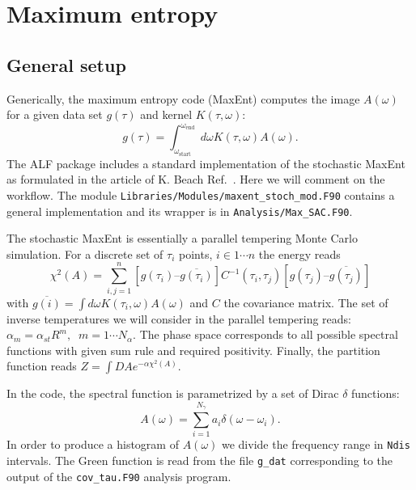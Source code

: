 

\section{Maximum entropy } \label{sec:maxent}

\subsection{General setup}
Generically, the maximum entropy code (MaxEnt) computes the  image  $A(\omega) $ for a given  data  set $g(\tau) $  and kernel $K(\tau,\omega) $:
\begin{equation}
g(\tau) =  \int_{\omega_\text{start}}^{\omega_\text{end}} d {\omega} K(\tau,\omega) A(\omega).
\end{equation} 
The  ALF package includes a standard implementation of the stochastic MaxEnt as formulated in the article of K. Beach Ref.~\cite{Beach04a}. Here we will comment on the workflow.  The module 
\texttt{Libraries/Modules/\allowbreak{}maxent\_stoch\_mod.F90} contains a general implementation and its wrapper is in \texttt{Analysis/Max\_SAC.F90}. 

The stochastic MaxEnt is essentially a parallel tempering Monte Carlo simulation.  For a discrete set of $\tau_i$ points,  $i \in 1 \cdots n $ the energy reads
\begin{equation}
  \chi^{2}(A) =  \sum_{i,j=1}^{n}   \left[ g(\tau_i)  –    \overline{g(\tau_i)} \right] C^{-1}(\tau_i,\tau_j) \left[    g(\tau_j)  –  \overline{g(\tau_j)} \right] 
\end{equation} with $ \overline{g(i)} =\int d{\omega} K(\tau_{i},\omega)  A(\omega)$ and  $C$ the covariance matrix. 
The set  of inverse temperatures  we will consider  in the parallel tempering reads:
$ \alpha_m = \alpha_{st}  R^{m}, \; \; m = 1 \cdots N_{\alpha} $.   The phase space corresponds to all possible spectral functions with given sum rule and required positivity.  Finally,  the partition function reads
$Z =  \int{DA} e^{-\alpha \chi^{2}(A)}$.  

In the code, the spectral function is parametrized  by a  set of Dirac $\delta$ functions: 
\begin{equation}
      A(\omega)  = \sum_{i=1}^{N_{\gamma}} a_{i} \delta \left( \omega - \omega_i \right).
\end{equation}
In order to produce a histogram of  $ A(\omega) $ we divide  the frequency range in \texttt{Ndis} intervals. 
The Green function is read from the file \texttt{g\_dat}  corresponding to the  output of the  \texttt{cov\_tau.F90} analysis program.

